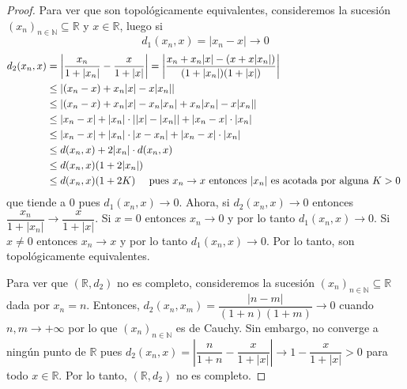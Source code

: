 \documentclass{article}
\theoremstyle{plain}
\theoremstyle{definition}
\newcommand{\R}{\mathbb{R}}
\newcommand{\N}{\mathbb{N}}
\begin{document}
\begin{proof}
    Para ver que son topológicamente equivalentes, consideremos la sucesión \( {(x_n)}_{n \in \N} \subseteq \R \) y \( x \in \R \), luego si \[
        d_1(x_n, x) = | x_n - x | \to 0
    \]
    \begin{align*}
        d_2(x_n, x) & = \left| \frac{x_n}{1+ |x_n|} - \frac{x}{1+|x|} \right | = \left| \frac{x_n + x_n | x | - (x + x | x_n |)}{(1 + |x_n|)(1 + |x|)} \right| \\
                    & \leq \left| (x_n - x) + x_n |x| - x |x_n| \right |                                                                                       \\
                    & \leq \left| (x_n - x) + x_n |x| - x_n |x_n| + x_n |x_n| - x |x_n| \right|                                                                \\
                    & \leq \left| x_n - x \right| + \left| x_n \right| \cdot \left| |x| - |x_n| \right| + \left| x_n - x \right| \cdot |x_n|                   \\
                    & \leq \left| x_n - x \right| + \left| x_n \right| \cdot \left| x - x_n \right| + \left| x_n - x \right| \cdot |x_n|                       \\
                    & \leq d(x_n, x) + 2 |x_n| \cdot d(x_n, x)                                                                                                 \\
                    & \leq d(x_n, x) (1 + 2 |x_n|)                                                                                                             \\
                    & \leq d(x_n, x) (1 + 2 K) \quad \text{ pues \( x_n \to x \) entonces \( |x_n| \) es acotada por alguna \( K > 0 \) }
    \end{align*}
    que tiende a \( 0 \) pues \( d_1(x_n, x) \to 0 \). Ahora, si \( d_2(x_n, x) \to 0 \) entonces \( \dfrac{x_n}{1 + |x_n|} \to \dfrac{x}{1 + |x|} \). Si \( x = 0 \) entonces \( x_n \to 0 \) y por lo tanto \( d_1(x_n, x) \to 0 \). Si \( x \neq 0 \) entonces \( x_n \to x \) y por lo tanto \( d_1(x_n, x) \to 0 \). Por lo tanto, son topológicamente equivalentes.

    Para ver que \( (\R, d_2) \) no es completo, consideremos la sucesión \( {(x_n)}_{n \in \N} \subseteq \R \) dada por \( x_n = n \). Entonces, \( d_2(x_n, x_m) = \dfrac{|n - m|}{(1 + n)(1 + m)} \to 0 \) cuando \( n, m \to +\infty \) por lo que \( {(x_n)}_{n \in \N} \) es de Cauchy. Sin embargo, no converge a ningún punto de \( \R \) pues \( d_2(x_n, x) = \left| \dfrac{n}{1 + n} - \dfrac{x}{1 + |x|} \right| \to 1 - \dfrac{x}{1 + |x|} > 0 \) para todo \( x \in \R \). Por lo tanto, \( (\R, d_2) \) no es completo.
\end{proof}
\end{document}
